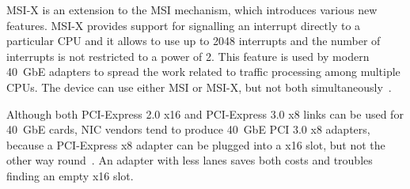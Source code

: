 MSI-X is an extension to the MSI mechanism, which introduces various new features.
MSI-X provides support for signalling an interrupt directly to a particular CPU
and it allows to use up to 2048 interrupts and the number of interrupts is not restricted to a power of 2.
This feature is used by modern 40~GbE adapters to spread
the work related to traffic processing among multiple CPUs.
The device can use either MSI or MSI-X, but not both simultaneously~\cite{msi-driver-guide}.

Although both PCI-Express 2.0 x16 and PCI-Express 3.0 x8 links can be used for 40~GbE cards,
NIC vendors tend to produce 40~GbE PCI 3.0 x8 adapters,
because a PCI-Express x8 adapter can be plugged into a x16 slot, but not the other way round~\cite{pcie-specification}.
An adapter with less lanes saves both costs and troubles finding an empty x16 slot.
